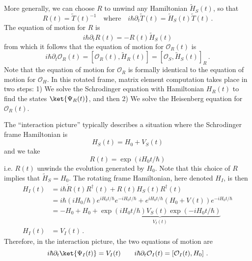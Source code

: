 More generally, we can choose $R$ to unwind any Hamiltonian $\tilde{H}_S(t)$, so that
\begin{equation}
  R(t) = \tilde{T}(t)^{-1}
  \quad \text{where} \quad
  i \hbar \partial_t \tilde{T}(t) = \tilde{H}_S(t) \tilde{T}(t)
  \, .
\end{equation}
The equation of motion for $R$ is
\begin{equation}
  i \hbar \partial_t R(t) = - R(t) \tilde{H}_S(t)
\end{equation}
from which it follows that the equation of motion for $\mathcal{O}_R(t)$ is
\begin{equation}
  i \hbar \partial_t \mathcal{O}_R(t)
  = \left[ \mathcal{O}_R(t), \tilde{H}_R(t) \right]
  = \left[ \mathcal{O}_S, \tilde{H}_S(t) \right]_R
  \, .
\end{equation}
Note that the equation of motion for $\mathcal{O}_R$ is formally identical to the equation of motion for $\mathcal{O}_H$.
In this rotated frame, matrix element computation takes place in two steps: 1) We solve the Schrodinger equation with Hamiltonian $H_R(t)$ to find the states $\ket{\Psi_R(t)}$, and then 2) We solve the Heisenberg equation for $\mathcal{O}_R(t)$.


The ``interaction picture'' typically describes a situation where the Schrodinger frame Hamiltonian is
\begin{equation}
  H_S(t) = H_0 + V_S(t)
\end{equation}
and we take
\begin{equation}
  R(t) = \exp(i H_0 t / \hbar)
\end{equation}
i.e. $R(t)$ unwinds the evolution generated by $H_0$.
Note that this choice of $R$ implies that $\tilde{H}_S = H_0$.
The rotating frame Hamiltonian, here denoted $H_I$, is then
\begin{align}
  H_I(t)
  &= i \hbar \dot{R}(t) R^\dagger(t) + R(t) H_S(t) R^\dagger(t) \nonumber \\
  &= i \hbar (i H_0 / \hbar) e^{i H_0 t / \hbar} e^{-i H_0 t / \hbar}
    + e^{i H_0 t / \hbar} \left( H_0 + V(t) \right) e^{-i H_0 t/ \hbar} \nonumber \\
  &= - H_0 + H_0 +
    \underbrace{\exp \left(i H_0 t / \hbar \right) V_S(t) \exp \left(-i H_0 t / \hbar \right)}_{V_I(t)} \nonumber \\
  H_I(t) &= V_I(t)
  \, .
\end{align}
Therefore, in the interaction picture, the two equations of motion are
\begin{equation}
  i \hbar \partial_t \ket{\Psi_I(t)} = V_I(t)
  \qquad
  i \hbar \partial_t \mathcal{O}_I(t) = \left[ \mathcal{O}_I(t), H_0 \right]
  \, .
\end{equation}

